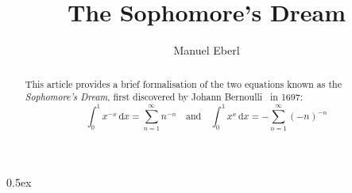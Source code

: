 \documentclass[11pt,a4paper]{article}
\begin{document}
\title{The Sophomore's Dream}
\author{Manuel Eberl}
\maketitle

\begin{abstract}
This article provides a brief formalisation of the two equations known as the \emph{Sophomore's Dream}, first discovered by Johann Bernoulli~\cite{bernoulli} in 1697:
\[\int_0^1 x^{-x}\,\text{d}x = \sum_{n=1}^\infty n^{-n} \quad\text{and}\quad \int_0^1 x^x\,\text{d}x = -\sum_{n=1}^\infty (-n)^{-n}\]
\end{abstract}

\tableofcontents
\parindent 0pt\parskip 0.5ex



\nocite{corless96}


\end{document}
